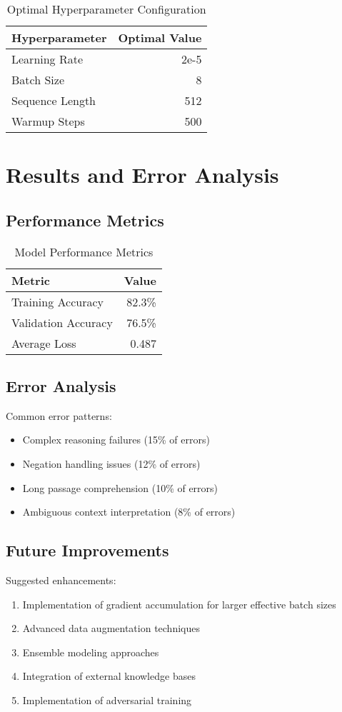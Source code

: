 \documentclass[12pt,a4paper]{report}
\begin{document}
\begin{table}[H]
\centering
\begin{tabular}{lr}
\toprule
Hyperparameter & Optimal Value \\
\midrule
Learning Rate & 2e-5 \\
Batch Size & 8 \\
Sequence Length & 512 \\
Warmup Steps & 500 \\
\bottomrule
\end{tabular}
\caption{Optimal Hyperparameter Configuration}
\end{table}

\chapter{Results and Error Analysis}
\section{Performance Metrics}
\begin{table}[H]
\centering
\begin{tabular}{lr}
\toprule
Metric & Value \\
\midrule
Training Accuracy & 82.3\% \\
Validation Accuracy & 76.5\% \\
Average Loss & 0.487 \\
\bottomrule
\end{tabular}
\caption{Model Performance Metrics}
\end{table}

\section{Error Analysis}
Common error patterns:
\begin{itemize}
    \item Complex reasoning failures (15\% of errors)
    \item Negation handling issues (12\% of errors)
    \item Long passage comprehension (10\% of errors)
    \item Ambiguous context interpretation (8\% of errors)
\end{itemize}

\section{Future Improvements}
Suggested enhancements:
\begin{enumerate}
    \item Implementation of gradient accumulation for larger effective batch sizes
    \item Advanced data augmentation techniques
    \item Ensemble modeling approaches
    \item Integration of external knowledge bases
    \item Implementation of adversarial training
\end{enumerate}
\end{document}
